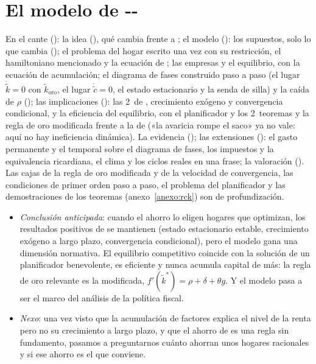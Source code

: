 \documentclass[11pt]{article}
\begin{document}
\section{El modelo de --}\label{sec:rck}

\begin{notaopositor}
En el cante (): la idea (), qué cambia frente a ; el modelo (): los supuestos, solo lo que cambia (); el problema del hogar escrito una vez con su restricción, el hamiltoniano mencionado y la ecuación de ; las empresas y el equilibrio, con la ecuación de acumulación; el diagrama de fases construido paso a paso (el lugar $\dot{\tilde k}=0$ con $\tilde k_{\mathrm{oro}}$, el lugar $\dot{\tilde c}=0$, el estado estacionario y la senda de silla) y la caída de $\rho$ (); las implicaciones (): las 2~de , crecimiento exógeno y convergencia condicional, y la eficiencia del equilibrio, con el planificador y los 2~teoremas y la regla de oro modificada frente a la de  («la avaricia rompe el saco» ya no vale: aquí no hay ineficiencia dinámica). La evidencia (); las extensiones (): el gasto permanente y el temporal sobre el diagrama de fases, los impuestos y la equivalencia ricardiana, el clima y los ciclos reales en una frase; la valoración (). Las cajas de la regla de oro modificada y de la velocidad de convergencia, las condiciones de primer orden paso a paso, el problema del planificador y las demostraciones de los teoremas (anexo~\ref{anexo:rck}) son de profundización.
\end{notaopositor}

\begin{itemize}
\item \emph{Conclusión anticipada}: cuando el ahorro lo eligen hogares que optimizan, los resultados positivos de  se mantienen (estado estacionario estable, crecimiento exógeno a largo plazo, convergencia condicional), pero el modelo gana una dimensión normativa. El equilibrio competitivo coincide con la solución de un planificador benevolente, es eficiente y nunca acumula capital de más: la regla de oro relevante es la modificada, $f'(\tilde k^*)=\rho+\delta+\theta g$. Y el modelo pasa a ser el marco del análisis de la política fiscal.
\item \emph{Nexo}: una vez visto que la acumulación de factores explica el nivel de la renta pero no su crecimiento a largo plazo, y que el ahorro de  es una regla sin fundamento, pasamos a preguntarnos cuánto ahorran unos hogares racionales y si ese ahorro es el que conviene.
\end{itemize}
\end{document}
